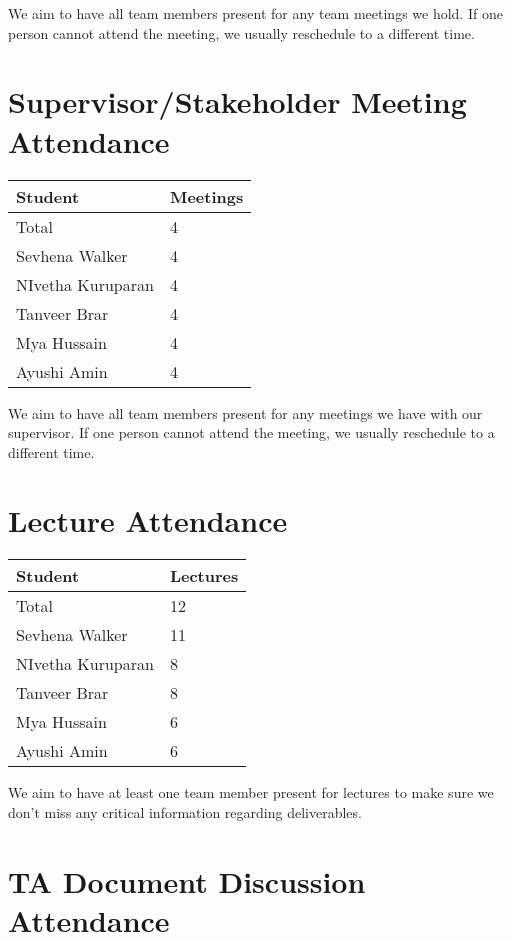 \documentclass{article}
\begin{document}
We aim to have all team members present for any team meetings we hold. If one person cannot attend the meeting, we usually reschedule to a different time.

\section{Supervisor/Stakeholder Meeting Attendance}

\begin{table}[H]
\centering
\begin{tabular}{ll}
\toprule
\textbf{Student} & \textbf{Meetings}\\
\midrule
Total & 4\\
Sevhena Walker & 4\\
NIvetha Kuruparan & 4\\
Tanveer Brar & 4\\
Mya Hussain & 4\\
Ayushi Amin & 4\\
\bottomrule
\end{tabular}
\end{table}

We aim to have all team members present for any meetings we have with our supervisor. If one person cannot attend the meeting, we usually reschedule to a different time.

\section{Lecture Attendance}

\begin{table}[H]
\centering
\begin{tabular}{ll}
\toprule
\textbf{Student} & \textbf{Lectures}\\
\midrule
Total & 12\\
Sevhena Walker & 11\\
NIvetha Kuruparan & 8\\
Tanveer Brar & 8\\
Mya Hussain & 6\\
Ayushi Amin & 6\\
\bottomrule
\end{tabular}
\end{table}

We aim to have at least one team member present for lectures to make sure we don't miss any critical information regarding deliverables.

\section{TA Document Discussion Attendance}
\end{document}
